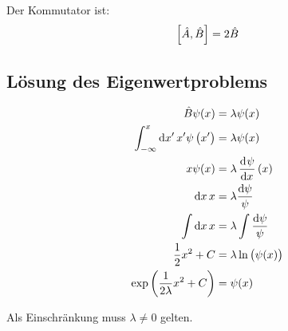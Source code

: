 Der Kommutator ist:
\[
	\sbr{\hat A, \hat B}
	=
	2 \hat B
\]


\subsection{Lösung des Eigenwertproblems}

\begin{align*}
	\hat B \psi(x) &= \lambda \psi(x) \\
	\int_{-\infty}^x \dif{x'} \, x' \psi\del{x'} &= \lambda \psi(x) \\
	x \psi(x) &= \lambda \dod\psi x(x) \\
	\dif x \, x &= \lambda \frac{\dif \psi}{\psi} \\
	\int \dif x \, x &= \lambda \int \frac{\dif \psi}{\psi} \\
	\half x^2 + C &= \lambda \ln\del{\psi(x)} \\
	\exp\del{\frac{1}{2\lambda} x^2 + C} &= \psi(x)
\end{align*}

Als Einschränkung muss $\lambda \neq 0$ gelten.


\IfFileExists{\bibliographyfile}{
}{}



